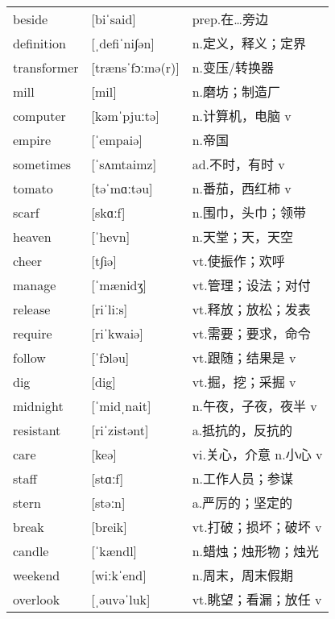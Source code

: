 \documentclass[a4paper]{article}
\begin{document}
\section{}
\begin{tabular}{l l l}

beside & [biˈsaid] & prep.在…旁边 \\
definition & [ˌdefiˈni∫ən] & n.定义，释义；定界 \\
transformer & [trænsˈfɔːmə(r)] & n.变压/转换器 \\
mill & [mil] & n.磨坊；制造厂 \\
computer & [kəmˈpjuːtə] & n.计算机，电脑 v \\
empire & [ˈempaiə] & n.帝国 \\
sometimes & [ˈsʌmtaimz] & ad.不时，有时 v \\
tomato & [təˈmɑːtəu] & n.番茄，西红柿 v \\
scarf & [skɑːf] & n.围巾，头巾；领带 \\
heaven & [ˈhevn] & n.天堂；天，天空 \\
cheer & [t∫iə] & vt.使振作；欢呼 \\
manage & [ˈmænidʒ] & vt.管理；设法；对付 \\
release & [riˈliːs] & vt.释放；放松；发表 \\
require & [riˈkwaiə] & vt.需要；要求，命令 \\
follow & [ˈfɔləu] & vt.跟随；结果是 v\\
dig & [dig] & vt.掘，挖；采掘 v \\
midnight & [ˈmidˌnait] & n.午夜，子夜，夜半 v\\
resistant & [riˈzistənt] & a.抵抗的，反抗的 \\
care & [keə] & vi.关心，介意 n.小心 v\\
staff & [stɑːf] & n.工作人员；参谋 \\
stern & [stəːn] & a.严厉的；坚定的 \\
break & [breik] & vt.打破；损坏；破坏 v \\
candle & [ˈkændl] & n.蜡烛；烛形物；烛光 \\
weekend & [wiːkˈend] & n.周末，周末假期 \\
overlook & [ˌəuvəˈluk] & vt.眺望；看漏；放任 v\\

\end{tabular}
\end{document}
